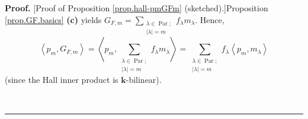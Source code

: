 \documentclass[numbers=enddot,12pt,final,onecolumn,notitlepage]{scrartcl}%
\theoremstyle{definition}
\newenvironment{proof}[1][Proof]{\noindent\textbf{#1.} }{\ \rule{0.5em}{0.5em}}
\let\sumnonlimits\sum
\renewcommand{\sum}{\sumnonlimits\limits}
\newenvironment{vershort}{}{}
\begin{document}
\begin{vershort}
\begin{proof}
[Proof of Proposition \ref{prop.hall-pmGFm} (sketched).]Proposition
\ref{prop.GF.basics} \textbf{(c)} yields $G_{F,m}=\sum_{\substack{\lambda
\in\operatorname*{Par};\\\left\vert \lambda\right\vert =m}}f_{\lambda
}m_{\lambda}$. Hence,%
\begin{equation}
\left\langle p_{m},G_{F,m}\right\rangle =\left\langle p_{m},\sum
_{\substack{\lambda\in\operatorname*{Par};\\\left\vert \lambda\right\vert
=m}}f_{\lambda}m_{\lambda}\right\rangle =\sum_{\substack{\lambda
\in\operatorname*{Par};\\\left\vert \lambda\right\vert =m}}f_{\lambda
}\left\langle p_{m},m_{\lambda}\right\rangle
\label{pf.prop.hall-pmGFm.short.1}%
\end{equation}
(since the Hall inner product is $\mathbf{k}$-bilinear).


\end{proof}
\end{vershort}
\end{document}
